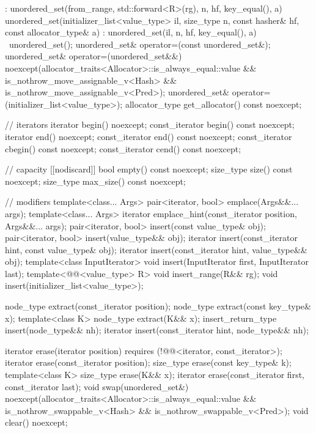 \begin{codeblock}
{{        : unordered_set(from_range, std::forward<R>(rg), n, hf, key_equal(), a) { }
    unordered_set(initializer_list<value_type> il, size_type n, const hasher& hf,
                  const allocator_type& a)
      : unordered_set(il, n, hf, key_equal(), a) { }
    ~unordered_set();
    unordered_set& operator=(const unordered_set&);
    unordered_set& operator=(unordered_set&&)
      noexcept(allocator_traits<Allocator>::is_always_equal::value &&
               is_nothrow_move_assignable_v<Hash> &&
               is_nothrow_move_assignable_v<Pred>);
    unordered_set& operator=(initializer_list<value_type>);
    allocator_type get_allocator() const noexcept;

    // iterators
    iterator       begin() noexcept;
    const_iterator begin() const noexcept;
    iterator       end() noexcept;
    const_iterator end() const noexcept;
    const_iterator cbegin() const noexcept;
    const_iterator cend() const noexcept;

    // capacity
    [[nodiscard]] bool empty() const noexcept;
    size_type size() const noexcept;
    size_type max_size() const noexcept;

    // modifiers
    template<class... Args> pair<iterator, bool> emplace(Args&&... args);
    template<class... Args> iterator emplace_hint(const_iterator position, Args&&... args);
    pair<iterator, bool> insert(const value_type& obj);
    pair<iterator, bool> insert(value_type&& obj);
    iterator insert(const_iterator hint, const value_type& obj);
    iterator insert(const_iterator hint, value_type&& obj);
    template<class InputIterator> void insert(InputIterator first, InputIterator last);
    template<@@<value_type> R>
      void insert_range(R&& rg);
    void insert(initializer_list<value_type>);

    node_type extract(const_iterator position);
    node_type extract(const key_type& x);
    template<class K> node_type extract(K&& x);
    insert_return_type insert(node_type&& nh);
    iterator           insert(const_iterator hint, node_type&& nh);

    iterator  erase(iterator position)
      requires (!@@<iterator, const_iterator>);
    iterator  erase(const_iterator position);
    size_type erase(const key_type& k);
    template<class K> size_type erase(K&& x);
    iterator  erase(const_iterator first, const_iterator last);
    void      swap(unordered_set&)
      noexcept(allocator_traits<Allocator>::is_always_equal::value &&
               is_nothrow_swappable_v<Hash> &&
               is_nothrow_swappable_v<Pred>);
    void      clear() noexcept;

}}
\end{codeblock}
